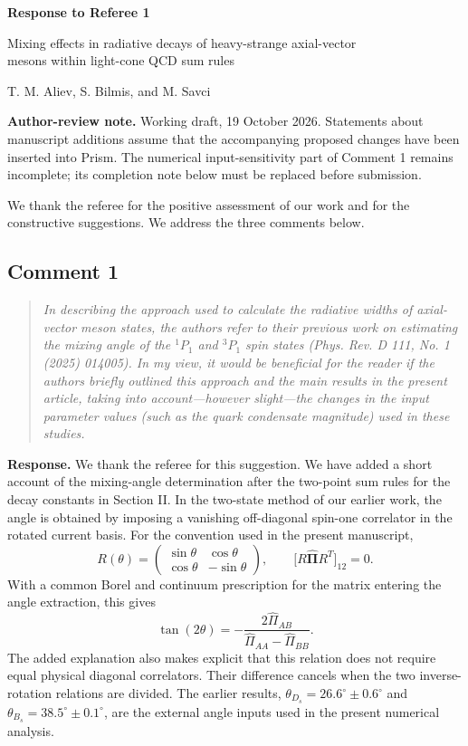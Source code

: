 \documentclass[11pt,a4paper]{article}
\newcommand{\authornote}[1]{\par\smallskip\noindent
 \colorbox{gray!10}{\parbox{\dimexpr\linewidth-2\fboxsep\relax}{\small
 \textbf{Author-review note.} #1}}\par\smallskip}
\newcommand{\commentheading}[1]{\Needspace{7\baselineskip}\subsection*{Comment #1}}
\begin{document}
\begin{center}
 {\Large\bfseries Response to Referee 1}\par\vspace{0.4em}
 {\normalsize Mixing effects in radiative decays of heavy-strange axial-vector\\
 mesons within light-cone QCD sum rules}\par\vspace{0.3em}
 T. M. Aliev, S. Bilmis, and M. Savci
\end{center}

\authornote{Working draft, 19 October 2026. Statements about manuscript
 additions assume that the accompanying proposed changes have been inserted
 into Prism. The numerical input-sensitivity part of Comment 1 remains
 incomplete; its completion note below must be replaced before submission.}

We thank the referee for the positive assessment of our work and for the
constructive suggestions. We address the three comments below.

\commentheading{1}
\begin{quote}\small\itshape
In describing the approach used to calculate the radiative widths of
axial-vector meson states, the authors refer to their previous work on
estimating the mixing angle of the $^1P_1$ and $^3P_1$ spin states
(Phys. Rev. D 111, No. 1 (2025) 014005). In my view, it would be beneficial
for the reader if the authors briefly outlined this approach and the main
results in the present article, taking into account---however slight---the
changes in the input parameter values (such as the quark condensate
magnitude) used in these studies.
\end{quote}

\textbf{Response.}
We thank the referee for this suggestion. We have added a short account of
the mixing-angle determination after the two-point sum rules for the decay
constants in Section II. In the two-state method of our earlier work,
the angle is obtained by imposing a vanishing off-diagonal spin-one
correlator in the rotated current basis. For the convention used in the
present manuscript,
\begin{equation}
 R(\theta)=\begin{pmatrix}\sin\theta&\cos\theta\\
 \cos\theta&-\sin\theta\end{pmatrix},\qquad
 \bigl[R\widehat{\boldsymbol\Pi}R^T\bigr]_{12}=0.
\end{equation}
With a common Borel and continuum prescription for the matrix entering
the angle extraction, this gives
\begin{equation}
 \tan(2\theta)=-\frac{2\widehat\Pi_{AB}}
 {\widehat\Pi_{AA}-\widehat\Pi_{BB}}.
\end{equation}
The added explanation also makes explicit that this relation does not
require equal physical diagonal correlators. Their difference cancels
when the two inverse-rotation relations are divided. The earlier results,
$\theta_{D_s}=26.6^\circ\pm0.6^\circ$ and
$\theta_{B_s}=38.5^\circ\pm0.1^\circ$, are the external angle inputs
used in the present numerical analysis.
\end{document}
